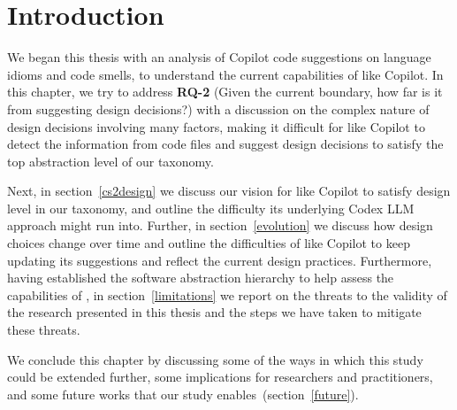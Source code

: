 \label{chapter:discussion}

\section{Introduction}
We began this thesis with an analysis of Copilot code suggestions on language idioms and code smells, to understand the current capabilities of \cct{} like Copilot.
In this chapter, we try to address \textbf{RQ-2} (Given the current boundary, how far is it from suggesting design decisions?) with a discussion on the complex nature of design decisions involving many factors, making it difficult for \cct{} like Copilot to detect the information from code files and suggest design decisions to satisfy the top abstraction level of our taxonomy.

Next, in section~\ref{cs2design} we discuss our vision for \cct{} like Copilot to satisfy design level in our taxonomy, and outline the difficulty its underlying Codex LLM approach might run into.
Further, in section~\ref{evolution} we discuss how design choices change over time and outline the difficulties of \cct{} like Copilot to keep updating its suggestions and reflect the current design practices.
Furthermore, having established the software abstraction hierarchy to help assess the capabilities of \cct{}, in section~\ref{limitations} we report on the threats to the validity of the research presented in this thesis and the steps we have taken to mitigate these threats.

We conclude this chapter by discussing some of the ways in which this study could be extended further, some implications for researchers and practitioners, and some future works that our study enables~(section~\ref{future}).







